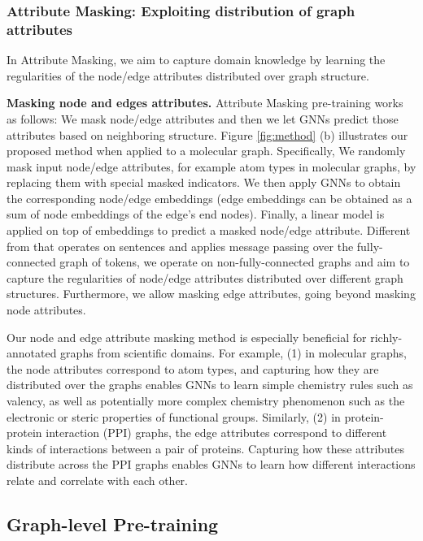 \documentclass{article} \usepackage{iclr2020_conference,times}
\numberwithin{equation}{section}
\theoremstyle{plain}
\theoremstyle{definition}
\theoremstyle{remark}
\begin{document}
\subsubsection{Attribute Masking: Exploiting distribution of graph attributes}
\label{sec:masking}
In Attribute Masking, we aim to capture domain knowledge by learning the regularities of the node/edge attributes distributed over graph structure. 

{\bf Masking node and edges attributes.}
Attribute Masking pre-training works as follows: We mask node/edge attributes and then we let GNNs predict those attributes \citep{devlin2018bert} based on neighboring structure. Figure \ref{fig:method} (b) illustrates our proposed method when applied to a molecular graph. Specifically, We randomly mask input node/edge attributes, for example atom types in molecular graphs, by replacing them with special masked indicators. We then apply GNNs to obtain the corresponding node/edge embeddings (edge embeddings can be obtained as a sum of node embeddings of the edge's end nodes). Finally, a linear model is applied on top of embeddings to predict a masked node/edge attribute.  
Different from \citet{devlin2018bert} that operates on sentences and applies message passing over the fully-connected graph of tokens, we operate on non-fully-connected graphs and aim to capture the regularities of node/edge attributes distributed over different graph structures. Furthermore, we allow masking edge attributes, going beyond masking node attributes.

Our node and edge attribute masking method is especially beneficial for richly-annotated graphs from scientific domains. For example, (1) in molecular graphs, the node attributes correspond to atom types, and capturing how they are distributed over the graphs enables GNNs to learn simple chemistry rules such as valency, as well as potentially more complex chemistry phenomenon such as the electronic or steric properties of functional groups. Similarly, (2) in protein-protein interaction (PPI) graphs, the edge attributes correspond to different kinds of interactions between a pair of proteins. Capturing how these attributes distribute across the PPI graphs enables GNNs to learn how different interactions relate and correlate with each other.

\subsection{Graph-level Pre-training}
\label{subsec:graph-level}
\end{document}
